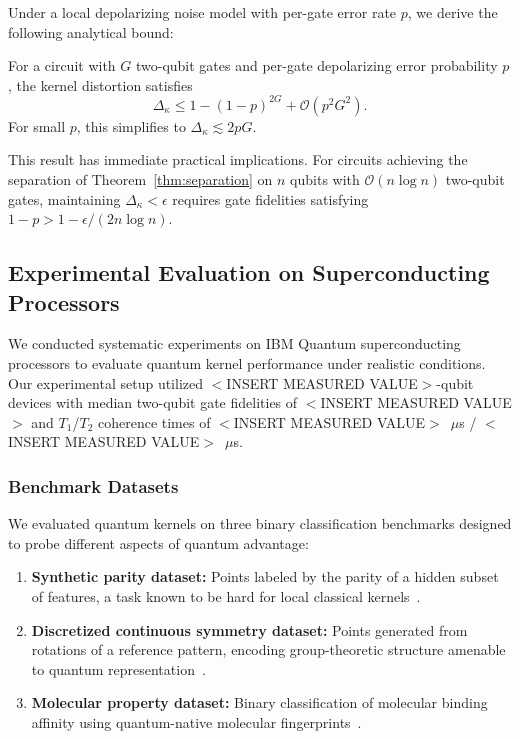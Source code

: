 \documentclass[aps,prb,reprint,superscriptaddress,showpacs]{revtex4-2}
\begin{document}
Under a local depolarizing noise model with per-gate error rate $p$, we derive the following analytical bound:

\begin{theorem}
\label{thm:noise}
For a circuit with $G$ two-qubit gates and per-gate depolarizing error probability $p$, the kernel distortion satisfies
\begin{equation}
    \Delta_\kappa \leq 1 - (1 - p)^{2G} + \mathcal{O}(p^2 G^2).
\end{equation}
For small $p$, this simplifies to $\Delta_\kappa \lesssim 2pG$.
\end{theorem}

This result has immediate practical implications. For circuits achieving the separation of Theorem~\ref{thm:separation} on $n$ qubits with $\mathcal{O}(n \log n)$ two-qubit gates, maintaining $\Delta_\kappa < \epsilon$ requires gate fidelities satisfying $1 - p > 1 - \epsilon/(2n \log n)$.


\subsection{Experimental Evaluation on Superconducting Processors}

We conducted systematic experiments on IBM Quantum superconducting processors to evaluate quantum kernel performance under realistic conditions. Our experimental setup utilized $<$INSERT MEASURED VALUE$>$-qubit devices with median two-qubit gate fidelities of $<$INSERT MEASURED VALUE$>$ and $T_1$/$T_2$ coherence times of $<$INSERT MEASURED VALUE$>$~$\mu$s / $<$INSERT MEASURED VALUE$>$~$\mu$s.

\subsubsection{Benchmark Datasets}

We evaluated quantum kernels on three binary classification benchmarks designed to probe different aspects of quantum advantage:
\begin{enumerate}[label=(\roman*)]
    \item \textbf{Synthetic parity dataset:} Points labeled by the parity of a hidden subset of features, a task known to be hard for local classical kernels~\cite{Daniely2020LearningParity}.
    \item \textbf{Discretized continuous symmetry dataset:} Points generated from rotations of a reference pattern, encoding group-theoretic structure amenable to quantum representation~\cite{Larocca2022GroupInvariant}.
    \item \textbf{Molecular property dataset:} Binary classification of molecular binding affinity using quantum-native molecular fingerprints~\cite{Huang2021PowerData}.
\end{enumerate}
\end{document}
